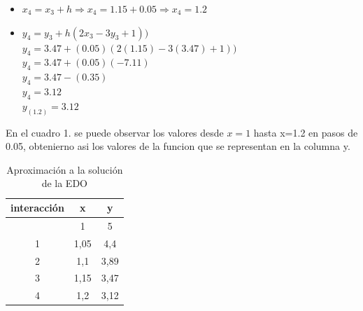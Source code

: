 \documentclass[12 pt,letterpaper]{article}
\begin{document}
\vspace{0.5mm} %
\begin{itemize}
\item\textbf{$x_{4}=x_{3}+h  \Rightarrow x_{4}=1.15+0.05\Rightarrow x_{4}=1.2 $} \\
\item\textbf{$y_{4}=y_{3}+h(2x_{3}-3y_{3}+1))$}\\
{$y_{4}=3.47+(0.05)(2(1.15)-3(3.47)+1))$}\\
{$y_{4}=3.47+(0.05)(-7.11)$}\\
{$y_{4}=3.47-(0.35)$}\\
{$y_{4}=3.12$}\\
\textbf{$y_{(1.2)}=3.12$}\\
\end{itemize}
En el cuadro 1. se puede observar los valores desde {$x=1$} hasta {x=1.2 }en pasos de 0.05, obtenierno asi los valores de la funcion que se representan en la columna  y.\\
\begin{table}[H]
\centering
\begin{tabular}{|c|c|c|}
   \hline
interacción & x & y\\
\hline
 & 1 & 5\\
\hline
1 & 1,05 & 4,4\\
\hline
2& 1,1 & 3,89\\
\hline
3& 1,15 & 3,47\\
\hline
4& 1,2 & 3,12\\
\hline
\end{tabular}
\caption{Aproximación a la solución de la EDO \\}

\end{table}
\end{document}
